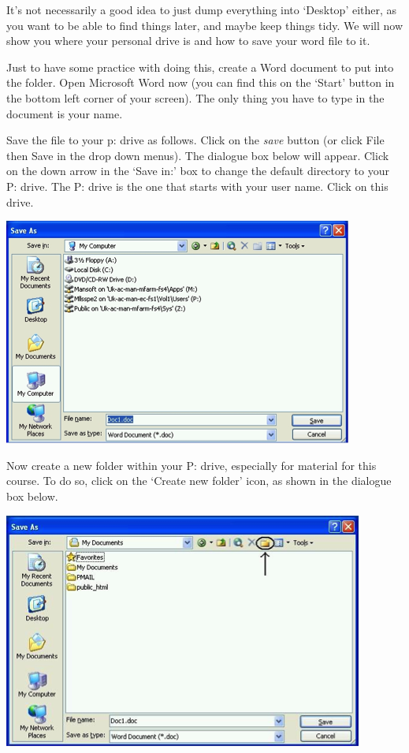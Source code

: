 \documentclass[]{book}
\theoremstyle{definition}
\theoremstyle{definition}
\theoremstyle{definition}
\theoremstyle{remark}
\begin{document}
It's not necessarily a good idea to just dump everything into `Desktop'
either, as you want to be able to find things later, and maybe keep
things tidy. We will now show you where your personal drive is and how
to save your word file to it.

 Just to have some practice with doing this, create a Word document to
put into the folder. Open Microsoft Word now (you can find this on the
`Start' button in the bottom left corner of your screen). The only thing
you have to type in the document is your name.

 Save the file to your p: drive as follows. Click on the \emph{save}
button (or click File then Save in the drop down menus). The dialogue
box below will appear. Click on the down arrow in the `Save in:' box to
change the default directory to your P: drive. The P: drive is the one
that starts with your user name. Click on this drive.

\includegraphics{imgs/save_doc_as.png}

 Now create a new folder within your P: drive, especially for material
for this course. To do so, click on the `Create new folder' icon, as
shown in the dialogue box below.

\includegraphics{imgs/create_folder.png}
\end{document}
